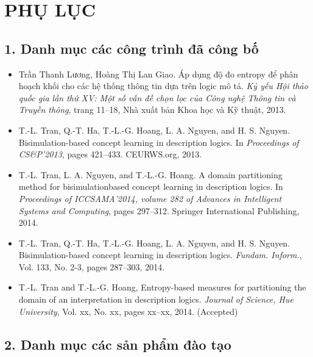 \chapter*{PHỤ LỤC}
\label{chap.PhuLuc}
\thispagestyle{fancy}

\section*{1. Danh mục các công trình đã công bố}
\begin{small}
	\begin{itemize}
		\item Trần Thanh Lương, Hoàng Thị Lan Giao. Áp dụng độ đo entropy để phân hoạch khối cho các hệ thống thông tin dựa trên logic mô tả. {\em Kỷ yếu Hội thảo quốc gia lần thứ XV: Một số vấn đề chọn lọc của Công nghệ Thông tin và Truyền thông}, trang 11--18, Nhà xuất bản Khoa học và Kỹ thuật, 2013.	
		
		\item T.-L. Tran, Q.-T. Ha, T.-L.-G. Hoang, L. A. Nguyen, and H. S. Nguyen. Bisimulation-based concept learning in description logics. In {\em Proceedings of CS\&P'2013}, pages 421--433. CEURWS.org, 2013.
		
		\item T.-L. Tran, L. A. Nguyen, and T.-L.-G. Hoang. A domain partitioning method for bisimulationbased concept learning in description logics. In {\em Proceedings of ICCSAMA'2014, volume 282 of Advances in Intelligent Systems and Computing}, pages 297--312. Springer International Publishing, 2014.
		
		\item T.-L. Tran, Q.-T. Ha, T.-L.-G. Hoang, L. A. Nguyen, and H. S. Nguyen. Bisimulation-based concept learning in description logics. {\em Fundam. Inform.}, Vol. 133, No. 2-3, pages 287--303, 2014.
		
		\item T.-L. Tran and T.-L.-G. Hoang, Entropy-based measures for partitioning the domain of an interpretation in description logics. {\em Journal of Science, Hue University}, Vol. xx, No. xx, pages xx--xx, 2014. (Accepted)
	\end{itemize}
\end{small}

\section*{2. Danh mục các sản phẩm đào tạo}

